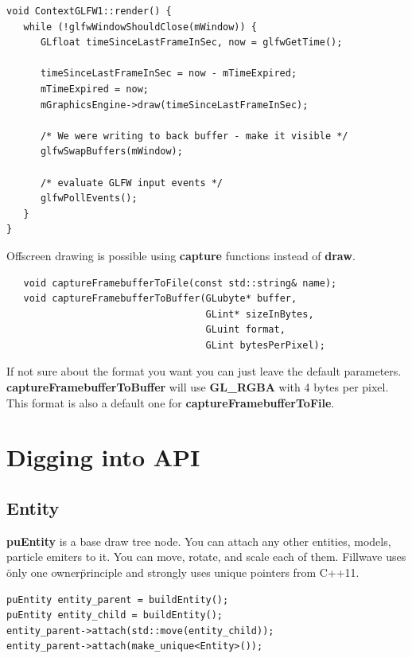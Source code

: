 \documentclass{article}
\begin{document}
\begin{lstlisting}
void ContextGLFW1::render() {
   while (!glfwWindowShouldClose(mWindow)) {
      GLfloat timeSinceLastFrameInSec, now = glfwGetTime();

      timeSinceLastFrameInSec = now - mTimeExpired;
      mTimeExpired = now;
      mGraphicsEngine->draw(timeSinceLastFrameInSec);

      /* We were writing to back buffer - make it visible */
      glfwSwapBuffers(mWindow);
      
      /* evaluate GLFW input events */
      glfwPollEvents();
   }
}
\end{lstlisting}

\indent Offscreen drawing is possible using \textbf{capture} functions instead of \textbf{draw}.

\begin{lstlisting}
   void captureFramebufferToFile(const std::string& name);
   void captureFramebufferToBuffer(GLubyte* buffer,
                                   GLint* sizeInBytes,
                                   GLuint format,
                                   GLint bytesPerPixel);
\end{lstlisting}
\indent \indent If not sure about the format you want you can just leave the default parameters. \textbf{captureFramebufferToBuffer} will use \textbf{GL\_RGBA} with 4 bytes per pixel. This format is also a default one for \textbf{captureFramebufferToFile}.

\section{Digging into API}

\subsection{Entity}\label{sec:Entity}
\indent \indent \textbf{puEntity} is a base draw tree node. You can attach any other entities, models, particle emiters to it. You can move, rotate, and scale each of them. Fillwave uses \"only one owner\" principle and strongly uses unique pointers from C++11.

\begin{lstlisting}
puEntity entity_parent = buildEntity();
puEntity entity_child = buildEntity();
entity_parent->attach(std::move(entity_child));
entity_parent->attach(make_unique<Entity>());
\end{lstlisting}
\end{document}
